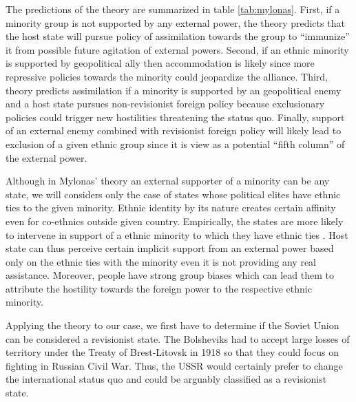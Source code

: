 The predictions of the theory are summarized in table \ref{tab:mylonas}. First, if a minority group is not supported by any external power, the theory predicts that the host state will pursue policy of assimilation towards the group to \enquote{immunize} it from possible future  agitation  of external powers. Second, if an ethnic minority is supported by geopolitical ally then accommodation is likely since more repressive policies towards the minority could jeopardize the alliance. Third, theory predicts assimilation if a minority is supported by an geopolitical enemy and a host state pursues non-revisionist foreign policy because exclusionary policies could trigger new hostilities threatening the status quo. 
Finally, support of an external enemy combined with revisionist foreign policy will likely lead to exclusion of a given ethnic group since it is view as a potential \enquote{fifth column} of the external power. 




Although in Mylonas' theory an  external supporter of a minority can be any state, 
we will considers only the  case of states whose political elites have ethnic ties to the given minority.  
Ethnic identity by its nature creates certain affinity even for co-ethnics outside given country. Empirically, the states are more likely to intervene in support of a 
ethnic minority to which they have ethnic ties \citep{davis_ethnicity_1997, saideman_ties_2001, saideman_discrimination_2002}. 
Host state can thus perceive certain implicit support from an external power based only on  the ethnic ties with the minority even it is not providing any real assistance. 
Moreover, people have strong group biases which can lead them to
attribute the hostility towards the foreign power to the respective ethnic minority. 

Applying the theory to our case, we first have to determine if the Soviet Union can be considered a revisionist state. The Bolsheviks had to accept large losses of territory under the Treaty of Brest-Litovsk in 1918 so that they could focus on fighting in Russian Civil War. Thus, the USSR would certainly prefer to change the international status quo and could be arguably classified as a revisionist state.


